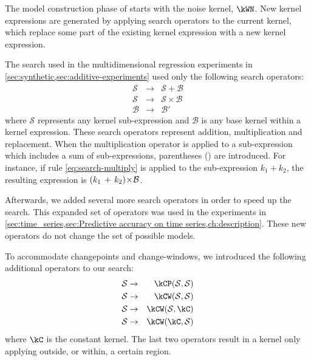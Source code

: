 The model construction phase of \procedurename{} starts with the noise kernel, $\kWN$.
New kernel expressions are generated by applying search operators to the current kernel, which replace some part of the existing kernel expression with a new kernel expression.



The search used in the multidimensional regression experiments in \cref{sec:synthetic,sec:additive-experiments} used only the following search operators:
%
\begin{eqnarray}
\mathcal{S} &\to& \mathcal{S} + \mathcal{B} \\
\mathcal{S} &\to& \mathcal{S} \times \mathcal{B} \label{eq:search-multiply}\\
\mathcal{B} &\to& \mathcal{B'}
\end{eqnarray}
%
where $\mathcal{S}$ represents any kernel sub-expression and $\mathcal{B}$ is any base kernel within a kernel expression.
These search operators represent addition, multiplication and replacement.
When the multiplication operator is applied to a sub-expression which includes a sum of sub-expressions, parentheses () are introduced.
For instance, if rule \eqref{eq:search-multiply} is applied to the sub-expression $k_1 + k_2$, the resulting expression is $(k_1 \, + \, k_2) \! \times \! \mathcal{B}$.

Afterwards, we added several more search operators in order to speed up the search.
This expanded set of operators was used in the experiments in \cref{sec:time_series,sec:Predictive accuracy on time series,ch:description}.
These new operators do not change the set of possible models.

To accommodate changepoints and change-windows, we introduced the following additional operators to our search:
%
\begin{eqnarray}
\mathcal{S} &\to& \kCP(\mathcal{S},\mathcal{S}) \\
\mathcal{S} &\to& \kCW(\mathcal{S},\mathcal{S}) \\
\mathcal{S} &\to& \kCW(\mathcal{S},\kC) \\
\mathcal{S} &\to& \kCW(\kC,\mathcal{S})
\end{eqnarray}
%
where $\kC$ is the constant kernel.
The last two operators result in a kernel only applying outside, or within, a certain region.

